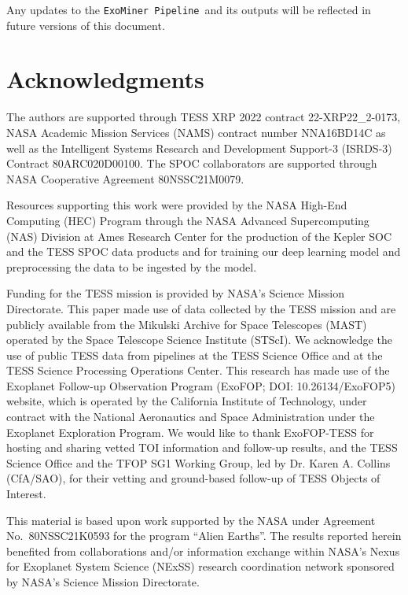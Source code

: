 \documentclass{article}
\newcommand{\ExoMinerPipeline}{\texttt{ExoMiner Pipeline}}
\begin{document}
Any updates to the \ExoMinerPipeline\ and its outputs will be reflected in future versions of this document.

\section*{Acknowledgments}

The authors are supported through TESS XRP 2022 contract 22-XRP22\_2-0173, NASA Academic Mission Services (NAMS) contract number NNA16BD14C as well as the Intelligent Systems Research and Development Support-3 (ISRDS-3) Contract 80ARC020D00100. The SPOC collaborators are supported through NASA Cooperative Agreement 80NSSC21M0079.

Resources supporting this work were provided by the NASA High-End Computing (HEC) Program through the NASA Advanced Supercomputing (NAS) Division at Ames Research Center for the production of the Kepler SOC and the TESS SPOC data products and for training our deep learning model and preprocessing the data to be ingested by the model. 

Funding for the TESS mission is provided by NASA's Science Mission Directorate. This paper made use of data collected by the TESS mission and are publicly available from the Mikulski Archive for Space Telescopes (MAST) operated by the Space Telescope Science Institute (STScI). We acknowledge the use of public TESS data from pipelines at the TESS Science Office and at the TESS Science Processing Operations Center. This research has made use of the Exoplanet Follow-up Observation Program (ExoFOP; DOI: 10.26134/ExoFOP5) website, which is operated by the California Institute of Technology, under contract with the National Aeronautics and Space Administration under the Exoplanet Exploration Program. We would like to thank ExoFOP-TESS for hosting and sharing vetted TOI information and follow-up results, and the TESS Science Office and the TFOP SG1 Working Group, led by Dr. Karen A. Collins (CfA/SAO), for their vetting and ground-based follow-up of TESS Objects of Interest.

This material is based upon work supported by the NASA under Agreement No.\ 80NSSC21K0593 for the program ``Alien Earths''. The results reported herein benefited from collaborations and/or information exchange within NASA’s Nexus for Exoplanet System Science (NExSS) research coordination network sponsored by NASA’s Science Mission Directorate.


\printbibliography[heading=bibintoc]
\end{document}
